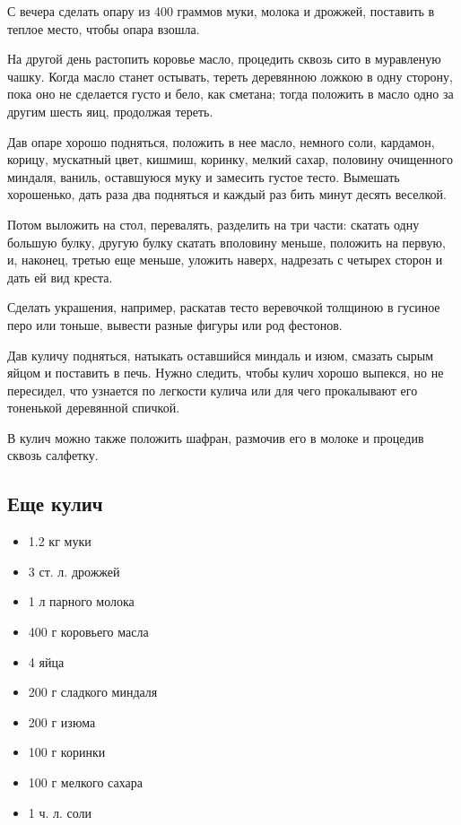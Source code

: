 С вечера сделать опару из 400 граммов муки, молока и дрожжей, поставить в теплое место, чтобы опара взошла.

На другой день растопить коровье масло, процедить сквозь сито в муравленую чашку. Когда масло станет остывать, тереть деревянною ложкою в одну сторону, пока оно не сделается густо и бело, как сметана; тогда положить в масло одно за другим шесть яиц, продолжая тереть.

Дав опаре хорошо подняться, положить в нее масло, немного соли, кардамон, корицу, мускатный цвет, кишмиш, коринку, мелкий сахар, половину очищенного миндаля, ваниль, оставшуюся муку и замесить густое тесто. Вымешать хорошенько, дать раза два подняться и каждый раз бить минут десять веселкой.

Потом выложить на стол, перевалять, разделить на три части: скатать одну большую булку, другую булку скатать вполовину меньше, положить на первую, и, наконец, третью еще меньше, уложить наверх, надрезать с четырех сторон и дать ей вид креста.

Сделать украшения, например, раскатав тесто веревочкой толщиною в гусиное перо или тоньше, вывести разные фигуры или род фестонов.

Дав куличу подняться, натыкать оставшийся миндаль и изюм, смазать сырым яйцом и поставить в печь. Нужно следить, чтобы кулич хорошо выпекся, но не пересидел, что узнается по легкости кулича или для чего прокалывают его тоненькой деревянной спичкой.

В кулич можно также положить шафран, размочив его в молоке и процедив сквозь салфетку.

\subsection{Еще кулич}

\begin{itemize}
	\item 1.2 кг муки 
    \item 3 ст. л. дрожжей 
    \item 1 л парного молока
    \item 400 г коровьего масла 
    \item 4 яйца
    \item 200 г сладкого миндаля
    \item 200 г изюма 
    \item 100 г коринки
    \item 100 г мелкого сахара 
    \item 1 ч. л. соли
\end{itemize}

